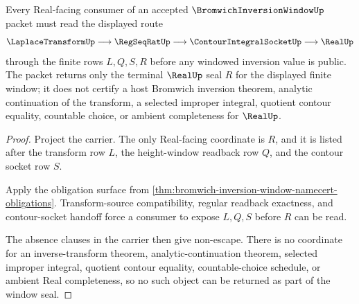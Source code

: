 \begin{theorem}
\label{thm:bromwich-inversion-window-real-seal-nonescape}
Every Real-facing consumer of an accepted $\BromwichInversionWindowUp$ packet must read the displayed route
$$
\LaplaceTransformUp \longrightarrow \RegSeqRatUp \longrightarrow \ContourIntegralSocketUp \longrightarrow \RealUp
$$
through the finite rows $L,Q,S,R$ before any windowed inversion value is public. The packet returns only the terminal $\RealUp$ seal $R$ for the displayed finite window; it does not certify a host Bromwich inversion theorem, analytic continuation of the transform, a selected improper integral, quotient contour equality, countable choice, or ambient completeness for $\RealUp$.
\end{theorem}
\begin{proof}
Project the carrier. The only Real-facing coordinate is $R$, and it is listed after the transform row $L$, the height-window readback row $Q$, and the contour socket row $S$.

Apply the obligation surface from \autoref{thm:bromwich-inversion-window-namecert-obligations}. Transform-source compatibility, regular readback exactness, and contour-socket handoff force a consumer to expose $L,Q,S$ before $R$ can be read.

The absence clauses in the carrier then give non-escape. There is no coordinate for an inverse-transform theorem, analytic-continuation theorem, selected improper integral, quotient contour equality, countable-choice schedule, or ambient Real completeness, so no such object can be returned as part of the window seal.
\end{proof}


\begin{closurestatus}{\BromwichInversionWindowUp}
  \theoryclosure{\seedClosure}
  \formalstatus{\unformalizedV}
\end{closurestatus}
